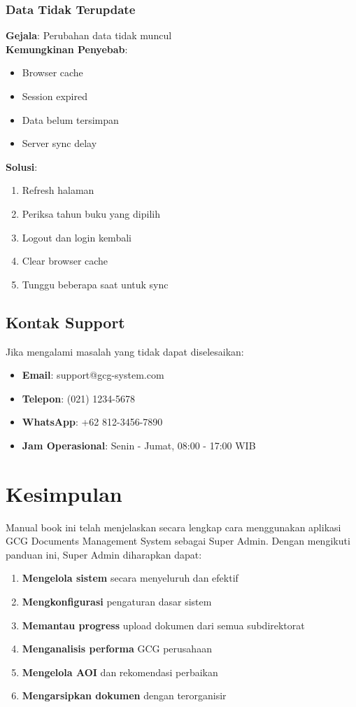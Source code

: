 \documentclass[12pt,a4paper]{article}
\begin{document}
\subsubsection{Data Tidak Terupdate}
\textbf{Gejala}: Perubahan data tidak muncul\\
\textbf{Kemungkinan Penyebab}:
\begin{itemize}
\item Browser cache
\item Session expired
\item Data belum tersimpan
\item Server sync delay
\end{itemize}
\textbf{Solusi}:
\begin{enumerate}
\item Refresh halaman
\item Periksa tahun buku yang dipilih
\item Logout dan login kembali
\item Clear browser cache
\item Tunggu beberapa saat untuk sync
\end{enumerate}

\subsection{Kontak Support}
Jika mengalami masalah yang tidak dapat diselesaikan:
\begin{itemize}
\item \textbf{Email}: support@gcg-system.com
\item \textbf{Telepon}: (021) 1234-5678
\item \textbf{WhatsApp}: +62 812-3456-7890
\item \textbf{Jam Operasional}: Senin - Jumat, 08:00 - 17:00 WIB
\end{itemize}

\section{Kesimpulan}

Manual book ini telah menjelaskan secara lengkap cara menggunakan aplikasi GCG Documents Management System sebagai Super Admin. Dengan mengikuti panduan ini, Super Admin diharapkan dapat:

\begin{enumerate}
\item \textbf{Mengelola sistem} secara menyeluruh dan efektif
\item \textbf{Mengkonfigurasi} pengaturan dasar sistem
\item \textbf{Memantau progress} upload dokumen dari semua subdirektorat
\item \textbf{Menganalisis performa} GCG perusahaan
\item \textbf{Mengelola AOI} dan rekomendasi perbaikan
\item \textbf{Mengarsipkan dokumen} dengan terorganisir
\end{enumerate}
\end{document}
